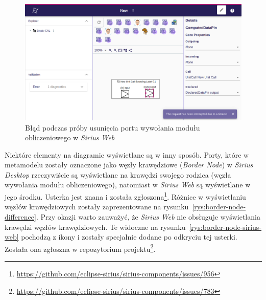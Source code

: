 \begin{figure}[!hb]
  \centering

  \includegraphics[width=0.95\linewidth]{./images/sirius-web-timeout-when-deleting-pins.png}
  \caption{Błąd podczas próby usunięcia portu wywołania modułu obliczeniowego w
    \emph{Sirius Web}}\label{rys:sirius-web-timeout-when-deleting-pins}
\end{figure}

Niektóre elementy na diagramie wyświetlane są w inny sposób. Porty, które w
metamodelu zostały oznaczone jako węzły krawędziowe (\emph{Border Node}) w
\emph{Sirius Desktop} rzeczywiście są wyświetlane na krawędzi swojego rodzica
(węzła wywołania modułu obliczeniowego), natomiast w \emph{Sirius Web} są
wyświetlane w jego środku. Usterka jest znana i została zgłoszona\footnote{
	\url{https://github.com/eclipse-sirius/sirius-components/issues/956}
}. Różnice w wyświetlaniu węzłów krawędziowych zostały zaprezentowane na
rysunku~\ref{rys:border-node-difference}.
Przy okazji warto zauważyć, że \emph{Sirius Web} nie obsługuje wyświetlania
krawędzi węzłów krawędziowych. Te widoczne na
rysunku~\ref{rys:border-node-sirius-web} pochodzą z ikony i zostały specjalnie
dodane po odkryciu tej usterki. Została ona zgłoszna w repozytorium
projektu\footnote{
	\url{https://github.com/eclipse-sirius/sirius-components/issues/783}}.

